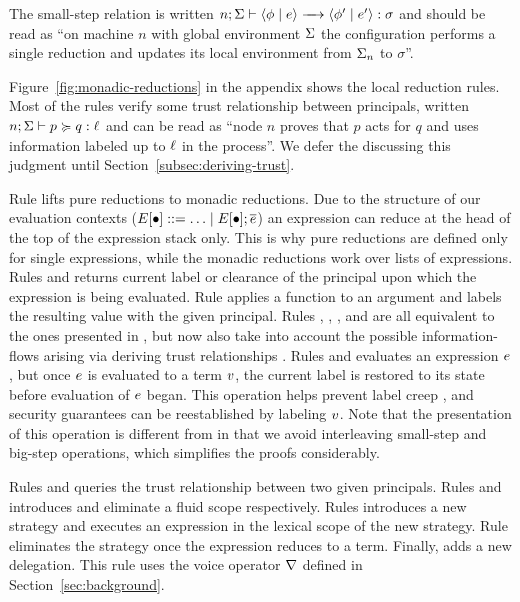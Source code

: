 The small-step relation is written $\step{n; \env}{\config{\store}{\expr}}{\config{\store'}{\expr'}}{\sigma}$ and should be read as ``on machine $n$ with global environment $\Sigma$ the configuration performs a single reduction and updates its local environment from $\Sigma_n$ to $\sigma$''.

Figure~\ref{fig:monadic-reductions} in the appendix shows the local reduction rules. Most of the rules verify some trust relationship between principals, written $n; \Sigma \vdash p \succcurlyeq q : \ell$ and can be read as ``node $n$ proves that $p$ acts for $q$ and uses information labeled up to $\ell$ in the process''. We defer the discussing this judgment until Section~\ref{subsec:deriving-trust}.

Rule  lifts pure reductions to monadic reductions. Due to the structure of our evaluation contexts ($E \lbrack \bullet \rbrack ::= \ldots \mid E \lbrack \bullet \rbrack ; \overline{e}$) an expression can reduce at the head of the top of the expression stack only. This is why pure reductions are defined only for single expressions, while the monadic reductions work over lists of expressions. Rules  and  returns current label or clearance of the principal upon which the expression is being evaluated. Rule  applies a function to an argument and labels the resulting value with the given principal. Rules , , ,  and  are all equivalent to the ones presented in \cite{SRMMlio}, but now also take into account the possible information-flows arising via deriving trust relationships \cite{Arden:2015:FA:2859845.2859998}. Rules  and  evaluates an expression $e$, but once $e$ is evaluated to a term $v$, the current label is restored to its state before evaluation of $e$ began. This operation helps prevent label creep \cite{SRMMlio}, and security guarantees can be reestablished by labeling $v$. Note that the presentation of this operation is different from \cite{SRMMlio} in that we avoid interleaving small-step and big-step operations, which simplifies the proofs considerably.

Rules  and  queries the trust relationship between two given principals. Rules  and  introduces and eliminate a fluid scope respectively. Rules  introduces a new strategy and executes an expression in the lexical scope of the new strategy. Rule  eliminates the strategy once the expression reduces to a term. Finally,  adds a new delegation. This rule uses the voice operator $\nabla$ defined in Section~\ref{sec:background}.

